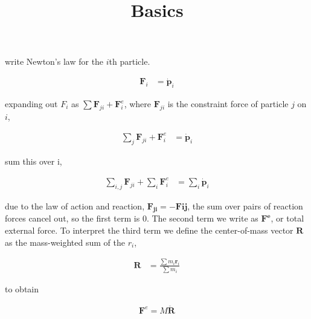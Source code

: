 \documentclass{article}
\title{Basics}
\date{}
\newcommand{\mb}{\mathbf}
\begin{document}
\maketitle

write Newton's law for the $i$th particle.

\begin{align}
\mb{F}_i &= \dot{\mb{p}}_i
\end{align}

expanding out $F_i$ as $\sum{\mb{F}_{ji}} + \mb{F}^e_i$, where $\mb{F}_{ji}$ is the constraint force of particle $j$ on $i$,

\begin{align}
\sum_j{\mb{F}_{ji}} + \mb{F}^e_i &= \dot{\mb{p}}_i
\end{align}

sum this over i,

\begin{align}
\sum_{i,j}{\mb{F}_{ji}} + \sum_i\mb{F}^e_i &= \sum_i\dot{\mb{p}}_i
\end{align}

due to the law of action and reaction, $\mb{F_{ji} = -F{ij}}$, the sum over pairs of reaction forces cancel out, so the first term is 0. The second term we write as $\mb{F^e}$, or total external force. To interpret the third term we define the center-of-mass vector $\mb{R}$ as the mass-weighted sum of the $r_i$,

\begin{align}
\mb{R} &= \frac{\sum{m_i \mb{r}_i}}{\sum{m_i}}
\end{align}

to obtain

\begin{align}
\mb{F}^e = M\mb{\ddot{R}}
\end{align}
\end{document}
